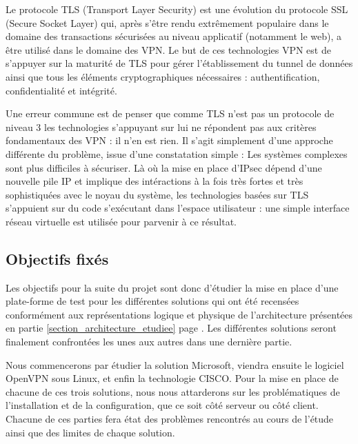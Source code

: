 Le protocole TLS (Transport Layer Security) est une évolution du protocole SSL (Secure Socket Layer) qui, après s'être rendu extrêmement populaire dans le domaine des transactions sécurisées au niveau applicatif (notamment le web), a être utilisé dans le domaine des VPN. Le but de ces technologies VPN est de s'appuyer sur la maturité de TLS pour gérer l'établissement du tunnel de données ainsi que tous les éléments cryptographiques nécessaires : authentification, confidentialité et intégrité.

Une erreur commune est de penser que comme TLS n'est pas un protocole de niveau 3 les technologies s'appuyant sur lui ne répondent pas aux critères fondamentaux des VPN : il n'en est rien. Il s'agit simplement d'une approche différente du problème, issue d'une constatation simple : Les systèmes complexes sont plus difficiles à sécuriser. Là où la mise en place d'IPsec dépend d'une nouvelle pile IP et implique des intéractions à la fois très fortes et très sophistiquées avec le noyau du système, les technologies basées sur TLS s'appuient sur du code s'exécutant dans l'espace utilisateur : une simple interface réseau virtuelle est utilisée pour parvenir à ce résultat.


\subsection{Objectifs fixés}

Les objectifs pour la suite du projet sont donc d'étudier la mise en place d'une plate-forme de test pour les différentes solutions qui ont été recensées conformément aux représentations logique et physique de l'architecture présentées en partie \ref{section_architecture_etudiee} page \pageref{section_architecture_etudiee}. Les différentes solutions seront finalement confrontées les unes aux autres dans une dernière partie.

Nous commencerons par étudier la solution Microsoft, viendra ensuite le logiciel OpenVPN sous Linux, et enfin la technologie CISCO. Pour la mise en place de chacune de ces trois solutions, nous nous attarderons sur les problématiques de l'installation et de la configuration, que ce soit côté serveur ou côté client. Chacune de ces parties fera état des problèmes rencontrés au cours de l'étude ainsi que des limites de chaque solution.


\pagebreak
